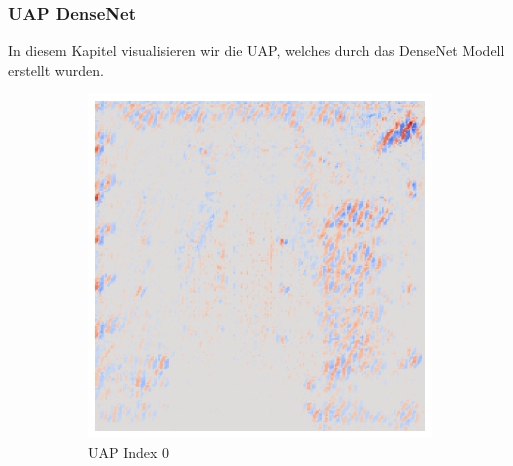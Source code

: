 \subsubsection{UAP DenseNet}
In diesem Kapitel visualisieren wir die UAP, welches durch das DenseNet Modell erstellt wurden.





\begin{figure}[ht!]
    \centering
    \begin{subfigure}{0.19\linewidth}
        \centering
        \includegraphics[height=1\linewidth]{01-images/05-resultate/uap_resnet/uap0-resnet18-covid-n200-robustificationslevel0.png}
        \caption{UAP Index 0}
    \end{subfigure}\hfill%
    \begin{subfigure}{0.19\linewidth}
        \centering

\end{subfigure}
\end{figure}
